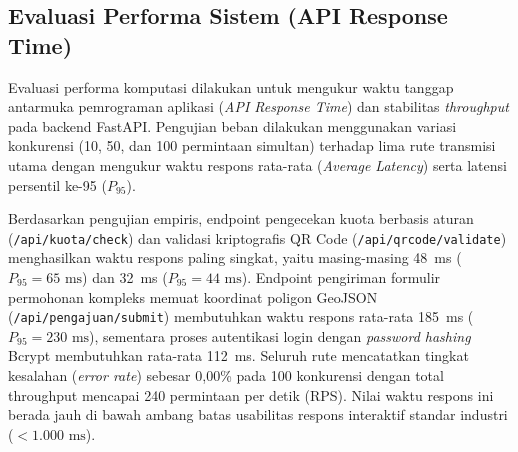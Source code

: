 \documentclass[conference]{IEEEtran}
\begin{document}
\subsection{Evaluasi Performa Sistem (API Response Time)}
Evaluasi performa komputasi dilakukan untuk mengukur waktu tanggap antarmuka pemrograman aplikasi (\textit{API Response Time}) dan stabilitas \textit{throughput} pada backend FastAPI. Pengujian beban dilakukan menggunakan variasi konkurensi (10, 50, dan 100 permintaan simultan) terhadap lima rute transmisi utama dengan mengukur waktu respons rata-rata (\textit{Average Latency}) serta latensi persentil ke-95 ($P_{95}$).

Berdasarkan pengujian empiris, endpoint pengecekan kuota berbasis aturan (\texttt{/api/kuota/check}) dan validasi kriptografis QR Code (\texttt{/api/qrcode/validate}) menghasilkan waktu respons paling singkat, yaitu masing-masing 48~ms ($P_{95} = 65\text{~ms}$) dan 32~ms ($P_{95} = 44\text{~ms}$). Endpoint pengiriman formulir permohonan kompleks memuat koordinat poligon GeoJSON (\texttt{/api/pengajuan/submit}) membutuhkan waktu respons rata-rata 185~ms ($P_{95} = 230\text{~ms}$), sementara proses autentikasi login dengan \textit{password hashing} Bcrypt membutuhkan rata-rata 112~ms. Seluruh rute mencatatkan tingkat kesalahan (\textit{error rate}) sebesar 0,00\% pada 100 konkurensi dengan total throughput mencapai 240 permintaan per detik (RPS). Nilai waktu respons ini berada jauh di bawah ambang batas usabilitas respons interaktif standar industri ($< 1.000\text{~ms}$).

\begin{table}[htbp]
\caption{Waktu Tanggap dan Kinerja RESTful API FastAPI}
\begin{center}
\label{tab:api_performance}
\end{center}
\end{table}
\end{document}

